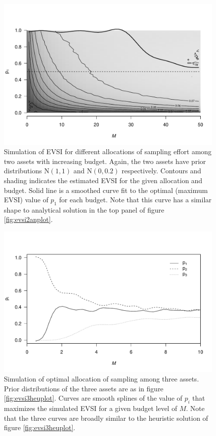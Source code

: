 \documentclass[]{article}
\theoremstyle{definition}
\theoremstyle{definition}
\theoremstyle{remark}
\begin{document}
\begin{figure}[htbp]
\centering
\includegraphics{voiConsAuc_files/figure-latex/evsi2simplot-1.pdf}
\caption{\label{fig:evsi2simplot}Simulation of EVSI for different allocations of
sampling effort among two assets with increasing budget. Again, the two
assets have prior distributions \(\mathrm{N}(1,1)\) and
\(\mathrm{N}(0,0.2)\) respectively. Contours and shading indicates the
estimated EVSI for the given allocation and budget. Solid line is a
smoothed curve fit to the optimal (maximum EVSI) value of \(p_1\) for
each budget. Note that this curve has a similar shape to analytical
solution in the top panel of figure \ref{fig:evsi2anplot}.}
\end{figure}








\begin{figure}[htbp]
\centering
\includegraphics{voiConsAuc_files/figure-latex/evsi3simplot-1.pdf}
\caption{\label{fig:evsi3simplot}Simulation of optimal allocation of sampling among
three assets. Prior distributions of the three assets are as in figure
\ref{fig:evsi3heuplot}. Curves are smooth splines of the value of
\(p_i\) that maximizes the simulated EVSI for a given budget level of
\(M\). Note that the three curves are broadly similar to the heuristic
solution of figure \ref{fig:evsi3heuplot}.}
\end{figure}
\end{document}
